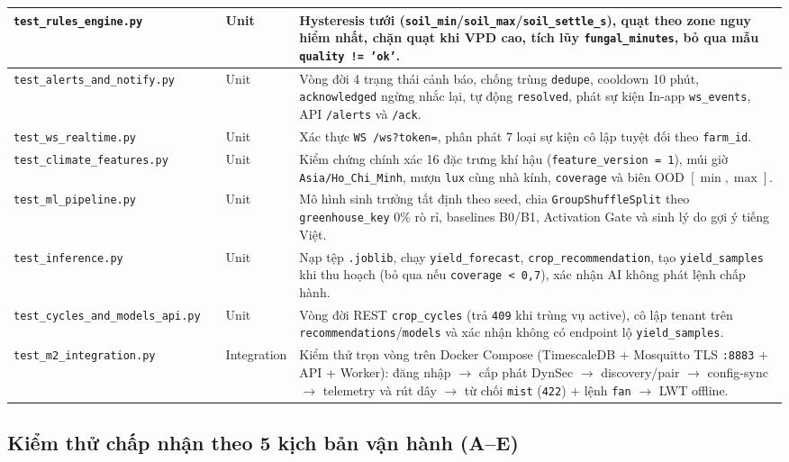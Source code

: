 \begin{longtable}{|>{\raggedright\arraybackslash}p{}|>{\centering\arraybackslash}p{}|>{\centering\arraybackslash}p{}|>{\raggedright\arraybackslash}p{}|}
\texttt{test\_rules\_engine.py} & 5 & Unit & Hysteresis tưới (\texttt{soil\_min}/\texttt{soil\_max}/\texttt{soil\_settle\_s}), quạt theo zone nguy hiểm nhất, chặn quạt khi VPD cao, tích lũy \texttt{fungal\_minutes}, bỏ qua mẫu \texttt{quality != 'ok'}. \\ \hline
\texttt{test\_alerts\_and\_notify.py} & 5 & Unit & Vòng đời 4 trạng thái cảnh báo, chống trùng \texttt{dedupe}, cooldown 10 phút, \texttt{acknowledged} ngừng nhắc lại, tự động \texttt{resolved}, phát sự kiện In-app \texttt{ws\_events}, API \texttt{/alerts} và \texttt{/ack}. \\ \hline
\texttt{test\_ws\_realtime.py} & 6 & Unit & Xác thực \texttt{WS /ws?token=}, phân phát 7 loại sự kiện cô lập tuyệt đối theo \texttt{farm\_id}. \\ \hline
\texttt{test\_climate\_features.py} & 3 & Unit & Kiểm chứng chính xác 16 đặc trưng khí hậu (\texttt{feature\_version = 1}), múi giờ \texttt{Asia/Ho\_Chi\_Minh}, mượn \texttt{lux} cùng nhà kính, \texttt{coverage} và biên OOD \([\min, \max]\). \\ \hline
\texttt{test\_ml\_pipeline.py} & 5 & Unit & Mô hình sinh trưởng tất định theo seed, chia \texttt{GroupShuffleSplit} theo \texttt{greenhouse\_key} 0\% rò rỉ, baselines B0/B1, Activation Gate và sinh lý do gợi ý tiếng Việt. \\ \hline
\texttt{test\_inference.py} & 6 & Unit & Nạp tệp \texttt{.joblib}, chạy \texttt{yield\_forecast}, \texttt{crop\_recommendation}, tạo \texttt{yield\_samples} khi thu hoạch (bỏ qua nếu \texttt{coverage < 0,7}), xác nhận AI không phát lệnh chấp hành. \\ \hline
\texttt{test\_cycles\_and\_models\_api.py} & 2 & Unit & Vòng đời REST \texttt{crop\_cycles} (trả \texttt{409} khi trùng vụ active), cô lập tenant trên \texttt{recommendations}/\texttt{models} và xác nhận không có endpoint lộ \texttt{yield\_samples}. \\ \hline
\texttt{test\_m2\_integration.py} & 1 & Integration & Kiểm thử trọn vòng trên Docker Compose (TimescaleDB + Mosquitto TLS \texttt{:8883} + API + Worker): đăng nhập \(\rightarrow\) cấp phát DynSec \(\rightarrow\) discovery/pair \(\rightarrow\) config-sync \(\rightarrow\) telemetry và rút dây \(\rightarrow\) từ chối \texttt{mist} (\texttt{422}) + lệnh \texttt{fan} \(\rightarrow\) LWT offline. \\ \hline
\end{longtable}
\endgroup

\subsection{Kiểm thử chấp nhận theo 5 kịch bản vận hành (A--E)}
\label{subsec:c4-acceptance}

